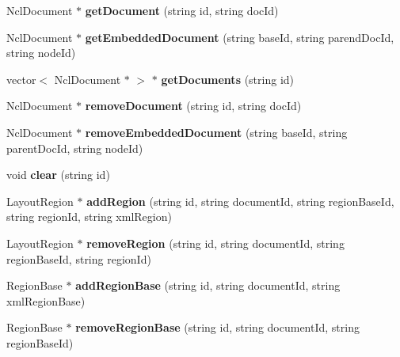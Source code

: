 \begin{CompactItemize}
\item 
NclDocument $\ast$ \textbf{getDocument} (string id, string docId)\label{classbr_1_1pucrio_1_1telemidia_1_1ginga_1_1ncl_1_1PrivateBaseManager_91bbea54107d5fb48e18f5decc74e093}

\item 
NclDocument $\ast$ \textbf{getEmbeddedDocument} (string baseId, string parendDocId, string nodeId)\label{classbr_1_1pucrio_1_1telemidia_1_1ginga_1_1ncl_1_1PrivateBaseManager_fd067a54d4ccc5d2a3c96f13473e428e}

\item 
vector$<$ NclDocument $\ast$ $>$ $\ast$ \textbf{getDocuments} (string id)\label{classbr_1_1pucrio_1_1telemidia_1_1ginga_1_1ncl_1_1PrivateBaseManager_f68aeb7a480b7209117e150dff0f9285}

\item 
NclDocument $\ast$ \textbf{removeDocument} (string id, string docId)\label{classbr_1_1pucrio_1_1telemidia_1_1ginga_1_1ncl_1_1PrivateBaseManager_8ddcec3e39d7d4d295183e1b26b1b605}

\item 
NclDocument $\ast$ \textbf{removeEmbeddedDocument} (string baseId, string parentDocId, string nodeId)\label{classbr_1_1pucrio_1_1telemidia_1_1ginga_1_1ncl_1_1PrivateBaseManager_8a7b2bfca328c5f9661ec2a42432cbdd}

\item 
void \textbf{clear} (string id)\label{classbr_1_1pucrio_1_1telemidia_1_1ginga_1_1ncl_1_1PrivateBaseManager_fe629e94066f5a6e8f4126a452ee38a0}

\item 
LayoutRegion $\ast$ \textbf{addRegion} (string id, string documentId, string regionBaseId, string regionId, string xmlRegion)\label{classbr_1_1pucrio_1_1telemidia_1_1ginga_1_1ncl_1_1PrivateBaseManager_98b04b081921e42fe60b622912fa73ce}

\item 
LayoutRegion $\ast$ \textbf{removeRegion} (string id, string documentId, string regionBaseId, string regionId)\label{classbr_1_1pucrio_1_1telemidia_1_1ginga_1_1ncl_1_1PrivateBaseManager_9328e830d4f64e7b620657622a02767c}

\item 
RegionBase $\ast$ \textbf{addRegionBase} (string id, string documentId, string xmlRegionBase)\label{classbr_1_1pucrio_1_1telemidia_1_1ginga_1_1ncl_1_1PrivateBaseManager_f7352c97fc4ca263808fd46735efbfe8}

\item 
RegionBase $\ast$ \textbf{removeRegionBase} (string id, string documentId, string regionBaseId)\label{classbr_1_1pucrio_1_1telemidia_1_1ginga_1_1ncl_1_1PrivateBaseManager_368b9d1008655087c5d2bb2b28074fc2}


\end{CompactItemize}
